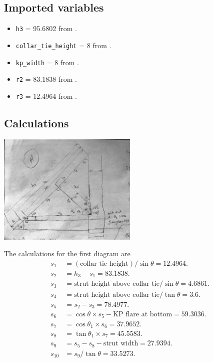 \documentclass{article}\usepackage[]{graphicx}\usepackage[]{xcolor}
\begin{document}
\subsection{Imported variables} \label{strut-kp-connections-imported-variables}
\begin{itemize}
  \item \verb+h3+ = 95.6802 from .
  \item \verb+collar_tie_height+ = 8 from .
  \item \verb+kp_width+ = 8 from .
  \item \verb+r2+ = 83.1838 from .
  \item \verb+r3+ = 12.4964 from .
\end{itemize}



\subsection{Calculations} \label{strut-kp-connections-calculations}


\begin{center}
	\includegraphics[width=0.5\textwidth]{images/strut_kp_overall}
\end{center}

The calculations for the first diagram are 
\begin{align*}
  s_1 &= (\text{collar tie height})/\sin\theta = 12.4964.\\
  s_2 &= h_3 - s_1 = 83.1838.\\
  s_3 &= \text{strut height above collar tie}/\sin\theta = 4.6861.\\
  s_4 &= \text{strut height above collar tie}/\tan\theta = 3.6.\\
  s_5 &= s_2 - s_3 = 78.4977.\\
  s_6 &= \cos\theta\times s_5 - \text{KP flare at bottom} = 59.3036.\\
  s_7 &= \cos\theta_1\times s_6 = 37.9652.\\
  s_8 &= \tan\theta_1\times s_7 = 45.5583.\\
  s_9 &= s_5 - s_8 - \text{strut width} = 27.9394.\\
  s_{10} &= s_9/\tan\theta = 33.5273.
\end{align*}
\end{document}
